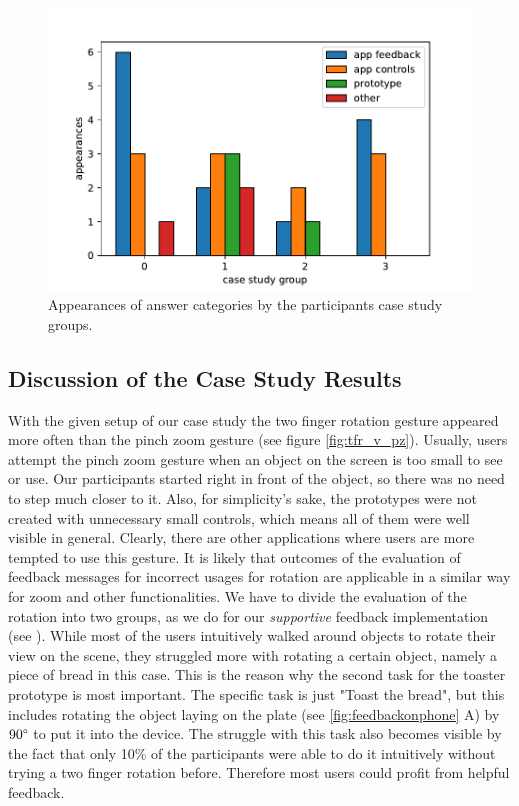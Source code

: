 \documentclass[11pt, a4paper]{article}
\begin{document}
			\begin{figure}[H]
				\centering
				\includegraphics[width=.49\textwidth]{img/plot/plot_tags_implementations.pdf}
				\caption{Appearances of answer categories by the participants case study groups.}
				\label{fig:tags_imp}
			\end{figure}


		\subsection*{Discussion of the Case Study Results}\label{ssec:discussion}
			With the given setup of our case study the two finger rotation gesture appeared more often than the pinch zoom gesture (see figure \ref{fig:tfr_v_pz}). Usually, users attempt the pinch zoom gesture when an object on the screen is too small to see or use. Our participants started right in front of the object, so there was no need to step much closer to it. Also, for simplicity's sake, the prototypes were not created with unnecessary small controls, which means all of them were well visible in general. Clearly, there are other applications where users are more tempted to use this gesture. It is likely that outcomes of the evaluation of feedback messages for incorrect usages for rotation are applicable in a similar way for zoom and other functionalities. We have to divide the evaluation of the rotation into two groups, as we do for our \emph{supportive} feedback implementation (see ). While most of the users intuitively walked around objects to rotate their view on the scene, they struggled more with rotating a certain object, namely a piece of bread in this case. This is the reason why the second task for the toaster prototype is most important. The specific task is just "Toast the bread", but this includes rotating the object laying on the plate (see \ref{fig:feedbackonphone} A) by $90\degree$ to put it into the device. The struggle with this task also becomes visible by the fact that only 10\% of the participants were able to do it intuitively without trying a two finger rotation before. Therefore most users could profit from helpful feedback.
\end{document}

